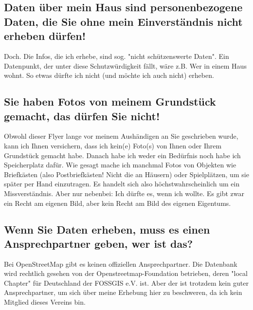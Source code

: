 \documentclass[10pt,foldmark,notumble]{leaflet}
\begin{document}
    \subsection{Daten über mein Haus sind personenbezogene Daten, die Sie ohne mein Einverständnis nicht erheben dürfen!}
    Doch. Die Infos, die ich erhebe, sind sog. "nicht schützenswerte Daten". Ein Datenpunkt, der unter diese Schutzwürdigkeit fällt, wäre z.B. Wer in einem Haus wohnt. So etwas dürfte ich nicht (und möchte ich auch nicht) erheben.

    \subsection{Sie haben Fotos von meinem Grundstück gemacht, das dürfen Sie nicht!}
    Obwohl dieser Flyer lange vor meinem Aushändigen an Sie geschrieben wurde, kann ich Ihnen versichern, dass ich kein(e) Foto(s) von Ihnen oder Ihrem Grundstück gemacht habe. Danach habe ich weder ein Bedürfnis noch habe ich Speicherplatz dafür. Wie gesagt mache ich manchmal Fotos von Objekten wie Briefkästen (also Postbriefkästen! Nicht die an Häusern) oder Spielplätzen, um sie später per Hand einzutragen. Es handelt sich also höchstwahrscheinlich um ein Missverständnis. Aber nur nebenbei: Ich dürfte es, wenn ich wollte. Es gibt zwar ein Recht am eigenen Bild, aber kein Recht am Bild des eigenen Eigentums.

    \subsection{Wenn Sie Daten erheben, muss es einen Ansprechpartner geben, wer ist das?}
    Bei OpenStreetMap gibt es keinen offiziellen Ansprechpartner. Die Datenbank wird rechtlich gesehen von der Openstreetmap-Foundation betrieben, deren "local Chapter" für Deutschland der FOSSGIS e.V. ist. Aber der ist trotzdem kein guter Ansprechpartner, um sich über meine Erhebung hier zu beschweren, da ich kein Mitglied dieses Vereins bin.
\end{document}
